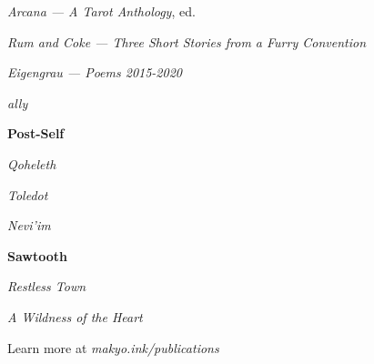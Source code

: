 \singlespacing
\thispagestyle{empty}
\begin{center}
    \TitleFamily

    \vspace{2ex}

    \emph{Arcana — A Tarot Anthology}, ed.

    \vspace{1ex}

    \emph{Rum and Coke — Three Short Stories from a Furry Convention}

    \vspace{1ex}

    \emph{Eigengrau — Poems 2015-2020}

    \vspace{1ex}

    \emph{ally}

    \vspace{2ex}
    
    \textbf{Post-Self}

    \emph{Qoheleth}

    \emph{Toledot}

    \emph{Nevi'im}

    \vspace{2ex}

    \textbf{Sawtooth}

    \emph{Restless Town}

    \emph{A Wildness of the Heart}

    \vspace{2em}

    Learn more at \emph{makyo.ink/publications}
\end{center}
\vfill
\singlespacing
